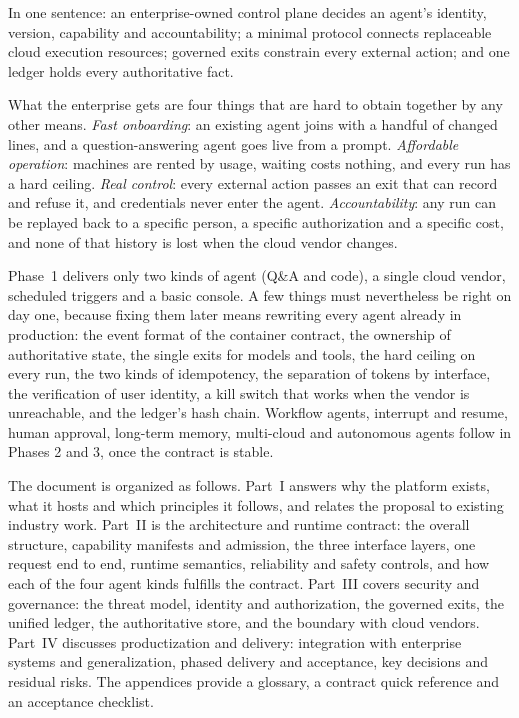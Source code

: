 In one sentence: an enterprise-owned control plane decides an agent's identity, version, capability and accountability; a minimal protocol connects replaceable cloud execution resources; governed exits constrain every external action; and one ledger holds every authoritative fact.

What the enterprise gets are four things that are hard to obtain together by any other means. \emph{Fast onboarding}: an existing agent joins with a handful of changed lines, and a question-answering agent goes live from a prompt. \emph{Affordable operation}: machines are rented by usage, waiting costs nothing, and every run has a hard ceiling. \emph{Real control}: every external action passes an exit that can record and refuse it, and credentials never enter the agent. \emph{Accountability}: any run can be replayed back to a specific person, a specific authorization and a specific cost, and none of that history is lost when the cloud vendor changes.

Phase~1 delivers only two kinds of agent (Q\&A and code), a single cloud vendor, scheduled triggers and a basic console. A few things must nevertheless be right on day one, because fixing them later means rewriting every agent already in production: the event format of the container contract, the ownership of authoritative state, the single exits for models and tools, the hard ceiling on every run, the two kinds of idempotency, the separation of tokens by interface, the verification of user identity, a kill switch that works when the vendor is unreachable, and the ledger's hash chain. Workflow agents, interrupt and resume, human approval, long-term memory, multi-cloud and autonomous agents follow in Phases 2 and 3, once the contract is stable.

The document is organized as follows. Part~I answers why the platform exists, what it hosts and which principles it follows, and relates the proposal to existing industry work. Part~II is the architecture and runtime contract: the overall structure, capability manifests and admission, the three interface layers, one request end to end, runtime semantics, reliability and safety controls, and how each of the four agent kinds fulfills the contract. Part~III covers security and governance: the threat model, identity and authorization, the governed exits, the unified ledger, the authoritative store, and the boundary with cloud vendors. Part~IV discusses productization and delivery: integration with enterprise systems and generalization, phased delivery and acceptance, key decisions and residual risks. The appendices provide a glossary, a contract quick reference and an acceptance checklist.

